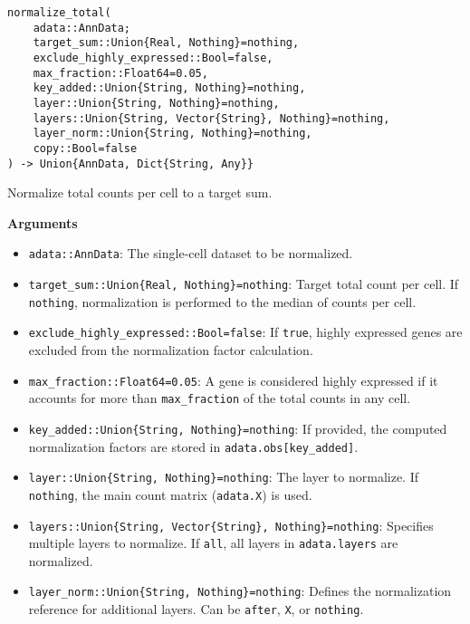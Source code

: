 \documentclass[oneside]{memoir}
\begin{document}
\begin{adjustwidth}{2em}{0pt}


\begin{verbatim}
normalize_total(
    adata::AnnData;
    target_sum::Union{Real, Nothing}=nothing,
    exclude_highly_expressed::Bool=false,
    max_fraction::Float64=0.05,
    key_added::Union{String, Nothing}=nothing,
    layer::Union{String, Nothing}=nothing,
    layers::Union{String, Vector{String}, Nothing}=nothing,
    layer_norm::Union{String, Nothing}=nothing,
    copy::Bool=false
) -> Union{AnnData, Dict{String, Any}}
\end{verbatim}

Normalize total counts per cell to a target sum.

\textbf{Arguments}

\begin{itemize}
\item \texttt{adata::AnnData}: The single-cell dataset to be normalized.


\item \texttt{target\_sum::Union\{Real, Nothing\}=nothing}: Target total count per cell. If \texttt{nothing}, normalization is performed to the median of counts per cell.


\item \texttt{exclude\_highly\_expressed::Bool=false}: If \texttt{true}, highly expressed genes are excluded from the normalization factor calculation.


\item \texttt{max\_fraction::Float64=0.05}: A gene is considered highly expressed if it accounts for more than \texttt{max\_fraction} of the total counts in any cell.


\item \texttt{key\_added::Union\{String, Nothing\}=nothing}: If provided, the computed normalization factors are stored in \texttt{adata.obs[key\_added]}.


\item \texttt{layer::Union\{String, Nothing\}=nothing}: The layer to normalize. If \texttt{nothing}, the main count matrix (\texttt{adata.X}) is used.


\item \texttt{layers::Union\{String, Vector\{String\}, Nothing\}=nothing}: Specifies multiple layers to normalize. If \texttt{{\textquotedbl}all{\textquotedbl}}, all layers in \texttt{adata.layers} are normalized.


\item \texttt{layer\_norm::Union\{String, Nothing\}=nothing}: Defines the normalization reference for additional layers. Can be \texttt{{\textquotedbl}after{\textquotedbl}}, \texttt{{\textquotedbl}X{\textquotedbl}}, or \texttt{nothing}.



\end{itemize}
\end{adjustwidth}
\end{document}
